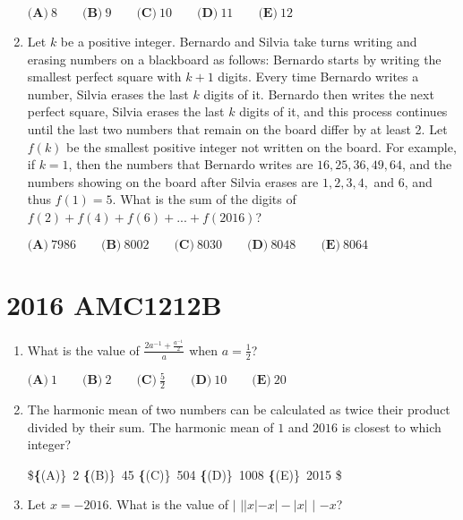 \documentclass{article}
\begin{document}
\begin{enumerate}[label=\arabic*., itemsep=0.5em]
$\textbf{(A)}\ 8\qquad\textbf{(B)}\ 9\qquad\textbf{(C)}\ 10\qquad\textbf{(D)}\ 11\qquad\textbf{(E)}\ 12$\par \vspace{0.5em}\item Let $k$ be a positive integer. Bernardo and Silvia take turns writing and erasing numbers on a blackboard as follows: Bernardo starts by writing the smallest perfect square with $k+1$ digits. Every time Bernardo writes a number, Silvia erases the last $k$ digits of it. Bernardo then writes the next perfect square, Silvia erases the last $k$ digits of it, and this process continues until the last two numbers that remain on the board differ by at least 2. Let $f(k)$ be the smallest positive integer not written on the board. For example, if $k = 1$, then the numbers that Bernardo writes are $16, 25, 36, 49, 64$, and the numbers showing on the board after Silvia erases are $1, 2, 3, 4,$ and $6$, and thus $f(1) = 5$. What is the sum of the digits of $f(2) + f(4)+ f(6) + ... + f(2016)$?

$\textbf{(A)}\ 7986\qquad\textbf{(B)}\ 8002\qquad\textbf{(C)}\ 8030\qquad\textbf{(D)}\ 8048\qquad\textbf{(E)}\ 8064$\par \vspace{0.5em}\end{enumerate}\newpage\section*{2016 AMC1212B}\begin{enumerate}[label=\arabic*., itemsep=0.5em]\item What is the value of $\frac{2a^{-1}+\frac{a^{-1}}{2}}{a}$ when $a= \frac{1}{2}$?

$\textbf{(A)}\ 1\qquad\textbf{(B)}\ 2\qquad\textbf{(C)}\ \frac{5}{2}\qquad\textbf{(D)}\ 10\qquad\textbf{(E)}\ 20$\par \vspace{0.5em}\item The harmonic mean of two numbers can be calculated as twice their product divided by their sum. The harmonic mean of $1$ and $2016$ is closest to which integer?

\$\textbf\{(A)\}\ 2 \qquad
\textbf\{(B)\}\ 45 \qquad
\textbf\{(C)\}\ 504 \qquad
\textbf\{(D)\}\ 1008 \qquad
\textbf\{(E)\}\ 2015 \$\par \vspace{0.5em}\item Let $x=-2016$. What is the value of $\bigg|$ $||x|-x|-|x|$ $\bigg|$ $-x$?


\end{enumerate}
\end{document}
